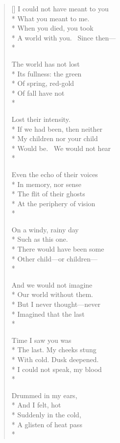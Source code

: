 \label{ch:december_22}
\settowidth{\versewidth}{A world with you.  Since then---}
\begin{verse}[\versewidth]
I could not have meant to you\\*
What you meant to me.\\*
When you died, you took\\*
A world with you.  Since then---\\*

The world has not lost \\*
Its fullness: the green\\*
Of spring, red-gold\\*
Of fall have not\\*

Lost their intensity.\\*
If we had been, then neither\\*
My children nor your child\\*
Would be.  We would not hear\\*

Even the echo of their voices \\*
In memory, nor sense\\*
The flit of their ghosts\\*
At the periphery of vision\\*

On a windy, rainy day \\*
Such as this one.\\*
There would have been some\\*
Other child---or children---\\*

And we would not imagine\\*
Our world without them.\\*
But I never thought---never\\*
Imagined that the last\\*

Time I saw you was\\*
The last. My cheeks stung\\*
With cold. Dusk deepened.\\*
I could not speak, my blood\\*

Drummed in my ears,\\*
And I felt, hot\\*
Suddenly in the cold,\\*
A glisten of heat pass\\*


\end{verse}
